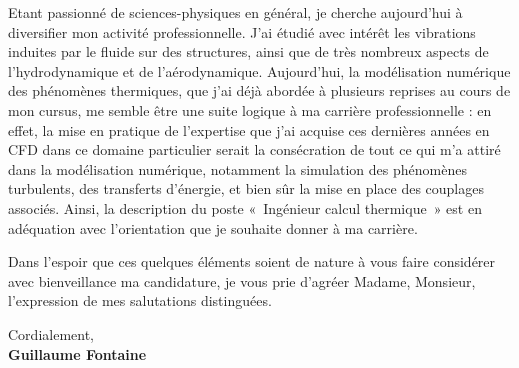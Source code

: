 \documentclass[11pt]{article}
\begin{document}
Etant passionné de sciences-physiques en général, je cherche aujourd'hui à diversifier mon activité professionnelle. J'ai étudié avec intérêt les vibrations induites par le fluide sur des structures, ainsi que de très nombreux aspects de l'hydrodynamique et de l'aérodynamique. Aujourd'hui, la modélisation numérique des phénomènes thermiques, que j'ai déjà abordée à plusieurs reprises au cours de mon cursus, me semble être une suite logique à ma carrière professionnelle : en effet, la mise en pratique de l'expertise que j'ai acquise ces dernières années en CFD dans ce domaine particulier serait la consécration de tout ce qui m'a attiré dans la modélisation numérique, notamment la simulation des phénomènes turbulents, des transferts d'énergie, et bien sûr la mise en place des couplages associés. Ainsi, la description du poste « Ingénieur calcul thermique » est en adéquation avec l'orientation que je souhaite donner à ma carrière.

Dans l’espoir que ces quelques éléments soient de nature à vous faire considérer avec bienveillance ma candidature, je vous prie d’agréer Madame, Monsieur, l’expression de mes salutations distinguées.

Cordialement,\\[2em] %
%
{\bfseries Guillaume Fontaine}\\
%

\vfill%
\end{document}
